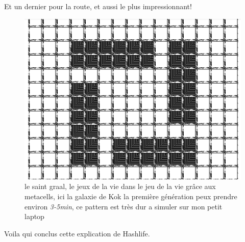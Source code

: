 Et un dernier pour la route, et aussi le plus impressionnant!
\begin{figure}[H]
        \center
        \includegraphics[scale=0.3]{images/imgHashlife/metacellgalaxy.png}
        \caption{le saint graal, le jeux de la vie dans le jeu de la vie grâce aux metacells, ici la galaxie de Kok la première génération peux prendre environ \textit{3-5min}, ce pattern est très dur a simuler sur mon petit laptop}
\end{figure}

Voila qui conclus cette explication de Hashlife.
